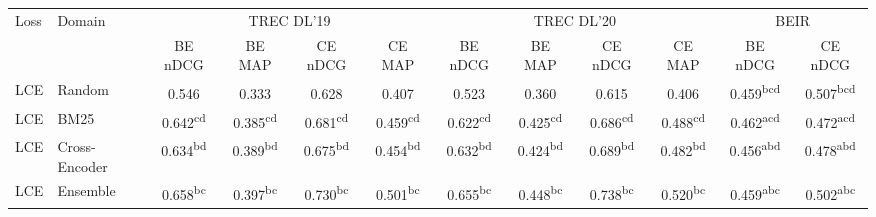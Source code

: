 \begin{table}[t]
  \centering
  \footnotesize
  \setlength{\tabcolsep}{3pt}
  \begin{tabular}{llcccccccccc}
  \toprule
    Loss & Domain & \multicolumn{4}{c}{TREC DL'19} & \multicolumn{4}{c}{TREC DL'20} & \multicolumn{2}{c}{BEIR} \\
  \cmidrule(lr){3-6}\cmidrule(lr){7-10}\cmidrule(lr){11-12}
    &  & BE nDCG & BE MAP & CE nDCG & CE MAP & BE nDCG & BE MAP & CE nDCG & CE MAP & BE nDCG & CE nDCG \\
  \midrule
  LCE & Random & 0.546\textsuperscript{\phantom{aaa}} & 0.333\textsuperscript{\phantom{aaa}} & 0.628\textsuperscript{\phantom{aaa}} & 0.407\textsuperscript{\phantom{aaa}} & 0.523\textsuperscript{\phantom{aaa}} & 0.360\textsuperscript{\phantom{aaa}} & 0.615\textsuperscript{\phantom{aaa}} & 0.406\textsuperscript{\phantom{aaa}} & 0.459\textsuperscript{bcd\phantom{}} & 0.507\textsuperscript{bcd\phantom{}} \\
  LCE & BM25 & 0.642\textsuperscript{cd\phantom{a}} & 0.385\textsuperscript{cd\phantom{a}} & 0.681\textsuperscript{cd\phantom{a}} & 0.459\textsuperscript{cd\phantom{a}} & 0.622\textsuperscript{cd\phantom{a}} & 0.425\textsuperscript{cd\phantom{a}} & 0.686\textsuperscript{cd\phantom{a}} & 0.488\textsuperscript{cd\phantom{a}} & 0.462\textsuperscript{acd\phantom{}} & 0.472\textsuperscript{acd\phantom{}} \\
  LCE & Cross-Encoder & 0.634\textsuperscript{bd\phantom{a}} & 0.389\textsuperscript{bd\phantom{a}} & 0.675\textsuperscript{bd\phantom{a}} & 0.454\textsuperscript{bd\phantom{a}} & 0.632\textsuperscript{bd\phantom{a}} & 0.424\textsuperscript{bd\phantom{a}} & 0.689\textsuperscript{bd\phantom{a}} & 0.482\textsuperscript{bd\phantom{a}} & 0.456\textsuperscript{abd\phantom{}} & 0.478\textsuperscript{abd\phantom{}} \\
  LCE & Ensemble & 0.658\textsuperscript{bc\phantom{a}} & 0.397\textsuperscript{bc\phantom{a}} & 0.730\textsuperscript{bc\phantom{a}} & 0.501\textsuperscript{bc\phantom{a}} & 0.655\textsuperscript{bc\phantom{a}} & 0.448\textsuperscript{bc\phantom{a}} & 0.738\textsuperscript{bc\phantom{a}} & 0.520\textsuperscript{bc\phantom{a}} & 0.459\textsuperscript{abc\phantom{}} & 0.502\textsuperscript{abc\phantom{}} \\

\end{tabular}
\end{table}
